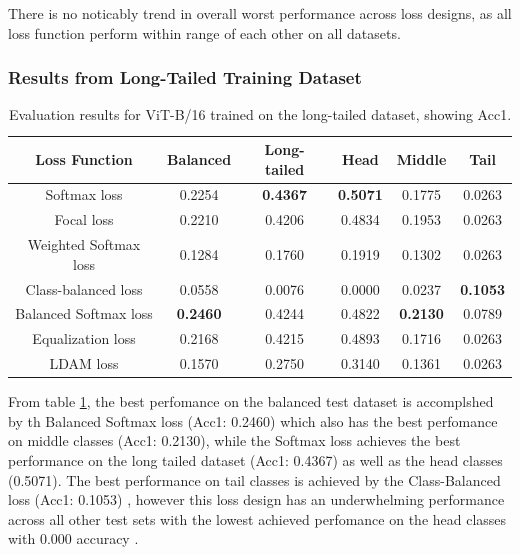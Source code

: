There is no noticably trend in overall worst performance across loss designs, as all loss function perform within range of each other on all datasets.


\subsubsection{Results from Long-Tailed Training Dataset}

\begin{table}[h!]
    \centering
    \caption{Evaluation results for ViT-B/16 trained on the long-tailed dataset, showing Acc1.}
    \begin{tabular}{cccccc}
        \toprule
        Loss Function & Balanced & Long-tailed & Head & Middle & Tail \\ 
        \midrule
        Softmax loss   & 0.2254 & \textbf{0.4367} & \textbf{0.5071} & 0.1775 & 0.0263 \\
        Focal loss   & 0.2210 & 0.4206 & 0.4834 & 0.1953 & 0.0263 \\
        Weighted Softmax loss   & 0.1284 & 0.1760 & 0.1919 & 0.1302 & 0.0263 \\
        Class-balanced loss   & 0.0558 & 0.0076 & 0.0000 & 0.0237 & \textbf{0.1053} \\
        Balanced Softmax loss   & \textbf{0.2460} & 0.4244 & 0.4822 &  \textbf{0.2130} & 0.0789 \\
        Equalization loss   & 0.2168 & 0.4215 & 0.4893 & 0.1716 & 0.0263 \\
        LDAM loss   & 0.1570 & 0.2750 & 0.3140 & 0.1361 & 0.0263 \\
        \bottomrule
    \end{tabular}
    \label{tab:vit_lt_acc1}
\end{table}




From table \ref{tab:vit_lt_acc1}, the best perfomance on the balanced test dataset is accomplshed by th Balanced Softmax loss (Acc1: 0.2460) which also has the best perfomance on middle classes (Acc1: 0.2130), while the Softmax loss achieves the best performance on the long tailed dataset (Acc1: 0.4367) as well as the head classes (0.5071). The best performance on tail classes is achieved by the Class-Balanced loss (Acc1: 0.1053) , however this loss design has an underwhelming performance across all other test sets with the lowest achieved perfomance on the head classes with 0.000 accuracy . 

